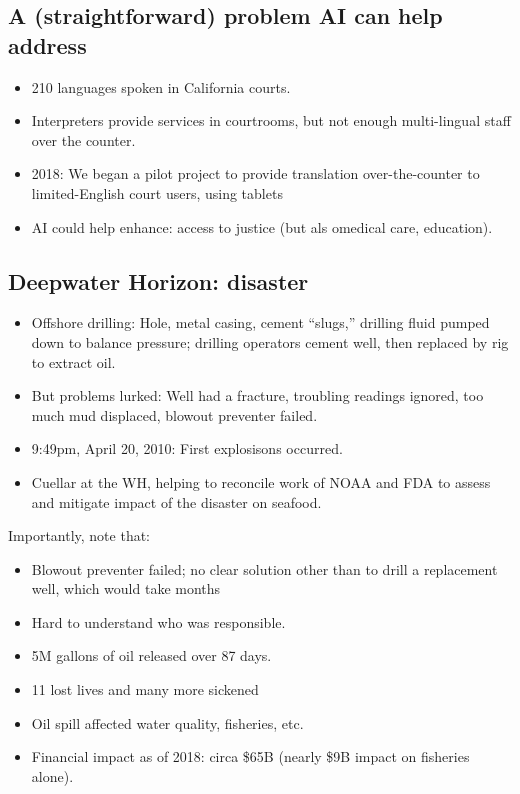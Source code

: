 \documentclass{article}
\begin{document}
\subsection{A (straightforward) problem AI can help address}

\begin{itemize}
  \item 210 languages spoken in California courts.
  \item Interpreters provide services in courtrooms, but not enough multi-lingual staff over the counter.
  \item 2018: We began a pilot project to provide translation over-the-counter to limited-English court users, using tablets
  \item AI could help enhance: access to justice (but als omedical care, education).
\end{itemize}

\subsection{Deepwater Horizon: disaster}

\begin{itemize}
  \item Offshore drilling: Hole, metal casing, cement ``slugs,'' drilling fluid pumped down to balance pressure; drilling operators cement well, then replaced by rig to extract oil.
  \item But problems lurked: Well had a fracture, troubling readings ignored, too much mud displaced, blowout preventer failed.
  \item 9:49pm, April 20, 2010: First explosisons occurred.
  \item Cuellar at the WH, helping to reconcile work of NOAA and FDA to assess and mitigate impact of the disaster on seafood.
\end{itemize}

Importantly, note that:
\begin{itemize}
  \item Blowout preventer failed; no clear solution other than to drill a replacement well, which would take months
  \item Hard to understand who was responsible.
  \item 5M gallons of oil released over 87 days.
  \item 11 lost lives and many more sickened
  \item Oil spill affected water quality, fisheries, etc.
  \item Financial impact as of 2018: circa \$65B (nearly \$9B impact on fisheries alone).
\end{itemize}
\end{document}
